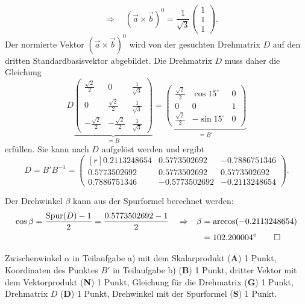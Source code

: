 \begin{loesung}
\begin{teilaufgaben}
\[\quad\Rightarrow\quad
(\vec{a}\times\vec{b})^0
=
\frac{1}{\!\sqrt{3}}
\begin{pmatrix*}
1\\
1\\
1
\end{pmatrix*}.
\]
Der normierte Vektor $(\vec{a}\times\vec{b})^0$ wird von der
gesuchten Drehmatrix $D$ auf den dritten Standardbasisvektor
abgebildet.
Die Drehmatrix $D$ muss daher die Gleichung
\[
D
\underbrace{
\begin{pmatrix*}
 \frac{\!\sqrt{2}}2 &          0          & \frac{1}{\!\sqrt{3}} \\
        0           &  \frac{\!\sqrt{2}}2 & \frac{1}{\!\sqrt{3}} \\
-\frac{\!\sqrt{2}}2 & -\frac{\!\sqrt{2}}2 & \frac{1}{\!\sqrt{3}}
\end{pmatrix*}
}_{\displaystyle =B}
=
\underbrace{
\begin{pmatrix*}
\frac{\!\sqrt{2}}2 &  \cos 15^\circ & 0 \\
        0          &         0      & 1 \\
\frac{\!\sqrt{2}}2 & -\sin 15^\circ & 0 
\end{pmatrix*}
}_{\displaystyle =B'}
\]
erfüllen.
Sie kann nach $D$ aufgelöst werden und ergibt
\[
D
=
B'B^{-1}
=
\begin{pmatrix*}[r]
   0.2113248654&  0.5773502692& -0.7886751346\\
   0.5773502692&  0.5773502692&  0.5773502692\\
   0.7886751346& -0.5773502692& -0.2113248654
\end{pmatrix*}.
\]
\item
Der Drehwinkel $\beta$ kann aus der Spurformel berechnet werden:
\begin{align*}
\cos\beta
&=
\frac{\operatorname{Spur}(D)-1}{2}
=
\frac{0.5773502692 -1}{2}
&&\Rightarrow&
\beta
&=
\arccos(-0.2113248654)
\\
&&&&&=
102.200004^\circ
\qedhere
\end{align*}
\end{teilaufgaben}
\end{loesung}

\begin{bewertung}
Zwischenwinkel $\alpha$ in Teilaufgabe a) mit dem Skalarprodukt
({\bf A}) 1 Punkt,
Koordinaten des Punktes $B'$ in Teilaufgabe b) ({\bf B}) 1 Punkt,
dritter Vektor mit dem Vektorprodukt ({\bf N}) 1 Punkt,
Gleichung für die Drehmatrix ({\bf G}) 1 Punkt,
Drehmatrix $D$ ({\bf D}) 1 Punkt,
Drehwinkel mit der Spurformel ({\bf S}) 1 Punkt.
\end{bewertung}
